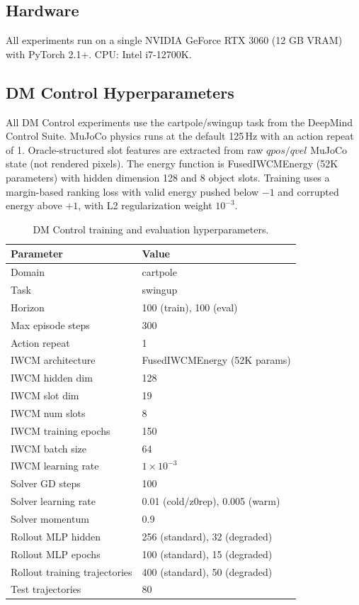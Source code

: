 \documentclass[12pt]{article}
\begin{document}
\subsection{Hardware}

All experiments run on a single NVIDIA GeForce RTX 3060 (12 GB VRAM) with PyTorch 2.1+. CPU: Intel i7-12700K.

\subsection{DM Control Hyperparameters}

All DM Control experiments use the cartpole/swingup task from the DeepMind Control Suite. MuJoCo physics runs at the default 125\,Hz with an action repeat of 1. Oracle-structured slot features are extracted from raw $qpos/qvel$ MuJoCo state (not rendered pixels). The energy function is FusedIWCMEnergy (52K parameters) with hidden dimension 128 and 8 object slots. Training uses a margin-based ranking loss with valid energy pushed below $-1$ and corrupted energy above $+1$, with L2 regularization weight $10^{-3}$.

\begin{table}[h]
\centering
\caption{DM Control training and evaluation hyperparameters.}
\label{app:tab:dm_params}
\begin{tabular}{@{}ll@{}}
\toprule
Parameter & Value \\
\midrule
Domain & cartpole \\
Task & swingup \\
Horizon & 100 (train), 100 (eval) \\
Max episode steps & 300 \\
Action repeat & 1 \\
IWCM architecture & FusedIWCMEnergy (52K params) \\
IWCM hidden dim & 128 \\
IWCM slot dim & 19 \\
IWCM num slots & 8 \\
IWCM training epochs & 150 \\
IWCM batch size & 64 \\
IWCM learning rate & $1\times 10^{-3}$ \\
Solver GD steps & 100 \\
Solver learning rate & 0.01 (cold/z0rep), 0.005 (warm) \\
Solver momentum & 0.9 \\
Rollout MLP hidden & 256 (standard), 32 (degraded) \\
Rollout MLP epochs & 100 (standard), 15 (degraded) \\
Rollout training trajectories & 400 (standard), 50 (degraded) \\
Test trajectories & 80 \\
\bottomrule
\end{tabular}
\end{table}
\end{document}
